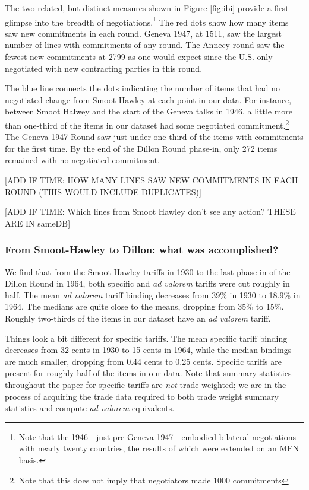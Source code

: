 \documentclass[
  12pt,
]{article}
\begin{document}
The two related, but distinct measures shown in Figure \ref{fig:ibi} provide a first glimpse into the breadth of negotiations.\footnote{Note that the 1946---just pre-Geneva 1947---embodied bilateral negotiations with nearly twenty countries, the results of which were extended on an MFN basis.} The red dots show how many items saw new commitments in each round. Geneva 1947, at 1511, saw the largest number of lines with commitments of any round. The Annecy round saw the fewest new commitments at 2799 as one would expect since the U.S. only negotiated with new contracting parties in this round.

The blue line connects the dots indicating the number of items that had no negotiated change from Smoot Hawley at each point in our data. For instance, between Smoot Halwey and the start of the Geneva talks in 1946, a little more than one-third of the items in our dataset had some negotiated commitment.\footnote{Note that this does not imply that negotiators made 1000 commitments} The Geneva 1947 Round saw just under one-third of the items with commitments for the first time. By the end of the Dillon Round phase-in, only 272 items remained with no negotiated commitment.

{[}ADD IF TIME: HOW MANY LINES SAW NEW COMMITMENTS IN EACH ROUND (THIS WOULD INCLUDE DUPLICATES){]}

{[}ADD IF TIME: Which lines from Smoot Hawley don't see any action? THESE ARE IN sameDB{]}

\hypertarget{from-smoot-hawley-to-dillon-what-was-accomplished}{%
\subsubsection{From Smoot-Hawley to Dillon: what was accomplished?}\label{from-smoot-hawley-to-dillon-what-was-accomplished}}

We find that from the Smoot-Hawley tariffs in 1930 to the last phase in of the Dillon Round in 1964, both specific and \emph{ad valorem} tariffs were cut roughly in half. The mean \emph{ad valorem} tariff binding decreases from 39\% in 1930 to 18.9\% in 1964. The medians are quite close to the means, dropping from 35\% to 15\%. Roughly two-thirds of the items in our dataset have an \emph{ad valorem} tariff.

Things look a bit different for specific tariffs. The mean specific tariff binding decreases from 32 cents in 1930 to 15 cents in 1964, while the median bindings are much smaller, dropping from 0.44 cents to 0.25 cents. Specific tariffs are present for roughly half of the items in our data. Note that summary statistics throughout the paper for specific tariffs are \emph{not} trade weighted; we are in the process of acquiring the trade data required to both trade weight summary statistics and compute \emph{ad valorem} equivalents.
\end{document}
